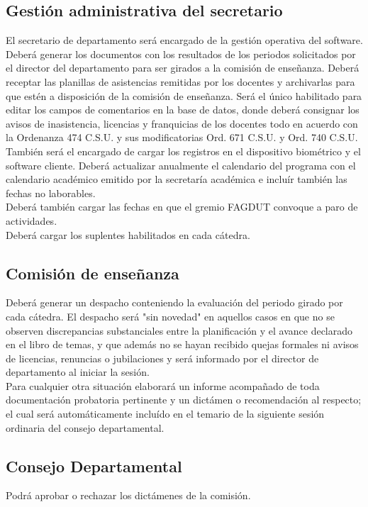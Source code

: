 \documentclass[a4paper, 11pt]{article} %
\begin{document}
\subsection{Gestión administrativa del secretario}
El secretario de departamento será encargado de la gestión operativa del software. Deberá generar los documentos con los resultados de los periodos solicitados por el director del departamento para ser girados a la comisión de enseñanza. Deberá receptar las planillas de asistencias remitidas por los docentes y archivarlas para que estén a disposición de la comisión de enseñanza. Será el único habilitado para editar los campos de comentarios en la base de datos, donde deberá consignar los avisos de inasistencia, licencias y franquicias de los docentes todo en acuerdo con la Ordenanza 474 C.S.U. y sus modificatorias Ord. 671 C.S.U. y Ord. 740 C.S.U.\\
También será el encargado de cargar los registros en el dispositivo biométrico y el software cliente. Deberá actualizar anualmente el calendario del programa con el calendario académico emitido por la secretaría académica e incluír también las fechas no laborables.\\
Deberá también cargar las fechas en que el gremio FAGDUT convoque a paro de actividades.\\
Deberá cargar los suplentes habilitados en cada cátedra.
\subsection{Comisión de enseñanza}
Deberá generar un despacho conteniendo la evaluación del periodo girado por cada cátedra. El despacho será "sin novedad" en aquellos casos en que no se observen discrepancias substanciales entre la planificación y el avance declarado en el libro de temas, y que además no se hayan recibido quejas formales ni avisos de licencias, renuncias o jubilaciones y será informado por el director de departamento al iniciar la sesión.\\
Para cualquier otra situación elaborará un informe acompañado de toda documentación probatoria pertinente y un dictámen o recomendación al respecto; el cual será automáticamente incluído en el temario de la siguiente sesión ordinaria del consejo departamental.
\subsection{Consejo Departamental}
Podrá aprobar o rechazar los dictámenes de la comisión.
\end{document}
